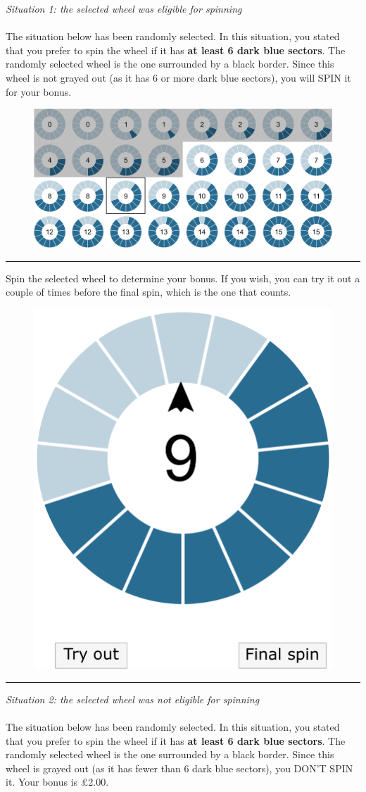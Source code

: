\documentclass[pdftex,12pt, a4paper]{article}
\begin{document}
\noindent \textit{Situation 1: the selected wheel was eligible for spinning}\\
\\
\noindent The situation below has been randomly selected.
In this situation, you stated that you prefer to spin the wheel if it has \textbf{at least 6 dark blue sectors}.
The randomly selected wheel is the one surrounded by a black border.
Since this wheel is not grayed out (as it has 6 or more dark blue sectors), you will SPIN it for your bonus.
\begin{figure}[h!]
	\centering
	{\includegraphics[width=\linewidth]{Fig12_Eligible.pdf}}
\end{figure}

\noindent \rule{\linewidth}{0.4pt}
\newpage
\noindent Spin the selected wheel to determine your bonus.
If you wish, you can try it out a couple of times before the final spin, which is the one that counts.
\begin{figure}[h!]
	\centering
	{\includegraphics[width=0.4\linewidth]{Fig13_FinalSpin.pdf}}
\end{figure}

\noindent \rule{\linewidth}{0.4pt}
\newpage
\noindent \textit{Situation 2: the selected wheel was not eligible for spinning}\\
\\
\noindent The situation below has been randomly selected.
In this situation, you stated that you prefer to spin the wheel if it has \textbf{at least 6 dark blue sectors}.
The randomly selected wheel is the one surrounded by a black border.
Since this wheel is grayed out (as it has fewer than 6 dark blue sectors), you DON'T SPIN it.
Your bonus is £2.00.
\end{document}
